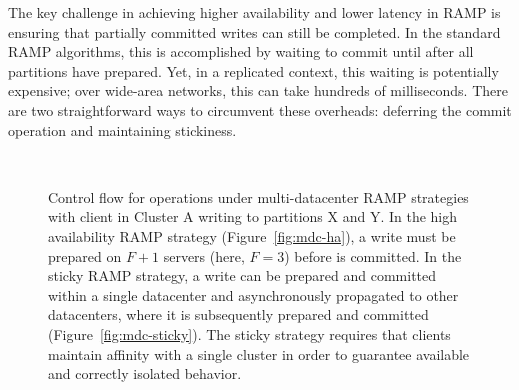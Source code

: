 The key challenge in achieving higher availability and lower latency in RAMP is ensuring that partially committed writes can still be completed. In the standard RAMP algorithms, this is accomplished by waiting to commit until after all partitions have prepared. Yet, in a replicated context, this waiting is potentially expensive; over wide-area networks, this can take hundreds of milliseconds. There are two straightforward ways to circumvent these overheads: deferring the commit operation and maintaining stickiness.


\begin{figure}[th!]
\begin{center}
\\
\vspace{1em}

\caption{Control flow for operations under multi-datacenter RAMP strategies with client in Cluster A writing to partitions X and Y. In the high availability RAMP strategy (Figure~\ref{fig:mdc-ha}), a write must be prepared on $F+1$ servers (here, $F=3$) before is committed. In the sticky RAMP strategy, a write can be prepared and committed within a single datacenter and asynchronously propagated to other datacenters, where it is subsequently prepared and committed (Figure~\ref{fig:mdc-sticky}). The sticky strategy requires that clients maintain affinity with a single cluster in order to guarantee available and correctly isolated behavior.} 
 \end{center} \label{fig:mdc} \end{figure}


